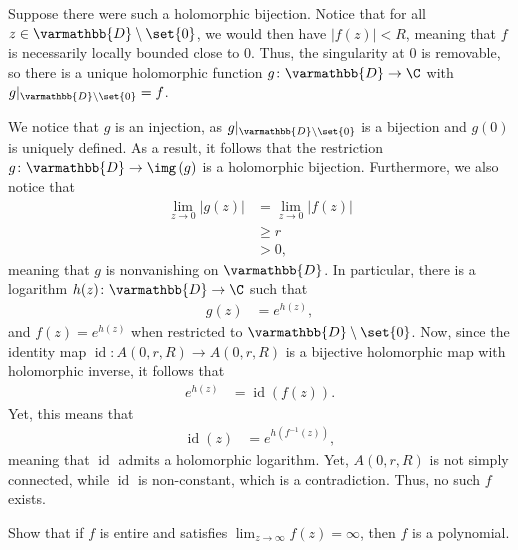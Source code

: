 \documentclass[10pt]{mypackage}
\renewcommand*{\mathbb}[1]{\varmathbb{#1}}
\begin{document}
\begin{solution}
  Suppose there were such a holomorphic bijection. Notice that for all $z\in \mathbb{D}\setminus \set{0}$, we would then have $\left\vert f(z) \right\vert < R$, meaning that $f$ is necessarily locally bounded close to $0$. Thus, the singularity at $0$ is removable, so there is a unique holomorphic function $g\colon \mathbb{D}\rightarrow \C$ with $g|_{ \mathbb{D}\setminus \set{0} } = f$.\newline

  We notice that $ g $ is an injection, as $g|_{ \mathbb{D}\setminus \set{0} }$ is a bijection and $g(0)$ is uniquely defined. As a result, it follows that the restriction $g\colon \mathbb{D}\rightarrow \img\left( g \right)$ is a holomorphic bijection. Furthermore, we also notice that
  \begin{align*}
    \lim_{z\rightarrow 0} \left\vert g(z) \right\vert &= \lim_{z\rightarrow 0} \left\vert f(z) \right\vert\\
                                                      &\geq r\\
                                                      &> 0,
  \end{align*}
  meaning that $g$ is nonvanishing on $ \mathbb{D} $. In particular, there is a logarithm $h(z)\colon \mathbb{D}\rightarrow \C$ such that 
  \begin{align*}
    g(z) &= e^{h(z)},
  \end{align*}
  and $f(z) = e^{h(z)}$ when restricted to $ \mathbb{D}\setminus \set{0} $. Now, since the identity map $\operatorname{id}\colon A\left( 0,r,R \right)\rightarrow A\left( 0,r,R \right)$ is a bijective holomorphic map with holomorphic inverse, it follows that
  \begin{align*}
    e^{h(z)} &= \operatorname{id}\left( f(z) \right).
  \end{align*}
  Yet, this means that
  \begin{align*}
    \operatorname{id}(z) &= e^{h\left( f^{-1}(z) \right)},
  \end{align*}
  meaning that $ \operatorname{id} $ admits a holomorphic logarithm. Yet, $A\left( 0,r,R \right)$ is not simply connected, while $ \operatorname{id} $ is non-constant, which is a contradiction. Thus, no such $f$ exists.
\end{solution}
\begin{problem}[Problem 4]
  Show that if $f$ is entire and satisfies $\lim_{z\rightarrow\infty} f\left( z \right) = \infty$, then $f$ is a polynomial.
\end{problem}
\end{document}
